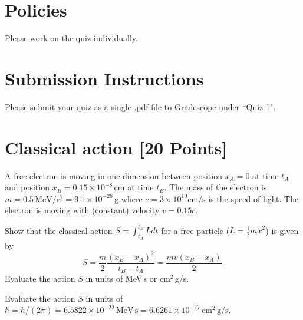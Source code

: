 \newif\ifshowsolutions
\showsolutionsfalse




\pagestyle{fancy}


\section*{Policies}
Please work on the quiz individually.

\section*{Submission Instructions}
Please submit your quiz as a single .pdf file to Gradescope under ``Quiz 1".

\section{Classical action [20 Points]}
A free electron is moving in one dimension between position $x_A=0$ at time $t_A$ and position $x_B=0.15\times 10^{-8}\,\mathrm{cm}$ at time $t_B$.
The mass of the electron is $m=0.5\,\mathrm{MeV}/c^2 = 9.1\times10^{-28}\,\mathrm{g}$ where $c=3\times10^{10}\mathrm{cm/s}$ is the speed of light.
The electron is moving with (constant) velocity $v=0.15c$.

\begin{problem}[10]
Show that the classical action $S = \int_{t_A}^{t_B} L dt$ for a free particle ($L = \frac{1}{2}m\dot{x}^2$) is given by
\begin{equation}
  S = \frac{m}{2}\frac{(x_B-x_A)^2}{t_B-t_A} =  \frac{mv(x_B-x_A)}{2}.
\end{equation}
Evaluate the action $S$ in units of MeV\,s or cm$^2$\,g/s.
\end{problem}

\begin{solution}

\end{solution}

\begin{problem}[5]
Evaluate the action $S$ in units of $\hbar = h/(2\pi) = 6.5822\times10^{-22}\,\mathrm{MeV\,s} = 6.6261\times 10^{-27}\,\mathrm{cm}^2\,\mathrm{g/s}$.
\end{problem}

